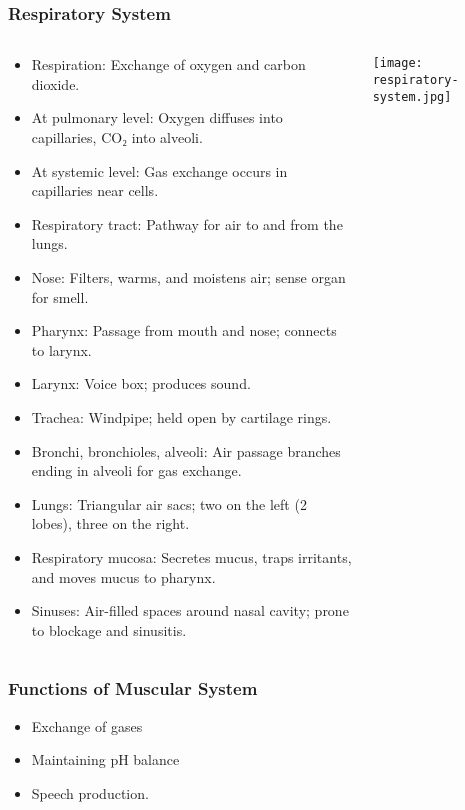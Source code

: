 \begin{frame}[fragile]\frametitle{Respiratory System}
\begin{columns}
    \begin{column}[T]{0.5\linewidth}
      \begin{itemize}
		\item Respiration: Exchange of oxygen and carbon dioxide.
		\item At pulmonary level: Oxygen diffuses into capillaries, CO₂ into alveoli.
		\item At systemic level: Gas exchange occurs in capillaries near cells.
		\item Respiratory tract: Pathway for air to and from the lungs.
		\item Nose: Filters, warms, and moistens air; sense organ for smell.
		\item Pharynx: Passage from mouth and nose; connects to larynx.
		\item Larynx: Voice box; produces sound.
		\item Trachea: Windpipe; held open by cartilage rings.
		\item Bronchi, bronchioles, alveoli: Air passage branches ending in alveoli for gas exchange.
		\item Lungs: Triangular air sacs; two on the left (2 lobes), three on the right.
		\item Respiratory mucosa: Secretes mucus, traps irritants, and moves mucus to pharynx.
		\item Sinuses: Air-filled spaces around nasal cavity; prone to blockage and sinusitis.
	  \end{itemize}
    \end{column}
    \begin{column}[T]{0.5\linewidth}
		\begin{center}
		\texttt{[image: respiratory-system.jpg]}
		\end{center}	
    \end{column}
  \end{columns}
\end{frame}
\begin{frame}[fragile]\frametitle{Functions of Muscular System }

      \begin{itemize}
		\item Exchange of gases
		\item Maintaining pH balance
		\item Speech production.
	  \end{itemize}

\end{frame}
	
